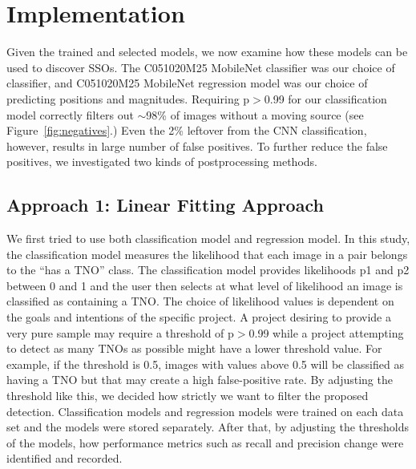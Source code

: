 \documentclass{aastex631}
\begin{document}

\section{Implementation}
\label{sect: Implementation}
Given the trained and selected models, we now examine how these models can be used to discover SSOs.
The C051020M25 MobileNet classifier was our choice of classifier, and C051020M25 MobileNet regression model was our choice of predicting positions and magnitudes.
Requiring p$>$0.99 for our classification model correctly filters out $\sim$98\% of images without a moving source (see Figure~\ref{fig:negatives}.)
Even the 2\% leftover from the CNN classification, however, results in large number of false positives.
To further reduce the false positives, we investigated two kinds of postprocessing methods.


\subsection{Approach 1: Linear Fitting Approach}
\label{Subsect: Linear Fitting Approach}
We first tried to use both classification model and regression model.
In this study, the classification model measures the likelihood that each image in a pair belongs to the ``has a TNO'' class.
The classification model provides likelihoods p1 and p2 between 0 and 1 and the user then selects at what level of likelihood an image is classified as containing a TNO. 
The choice of likelihood values is dependent on the goals and intentions of the specific project.
A project desiring to provide a very pure sample may require a threshold of p$>$0.99 while a project attempting to detect as many TNOs as possible might have a lower threshold value.
For example, if the threshold is 0.5, images with values above 0.5 will be classified as having a TNO but that may create a high false-positive rate. 
By adjusting the threshold like this, we decided how strictly we want to filter the proposed detection.
Classification models and regression models were trained on each data set and the models were stored separately.
After that, by adjusting the thresholds of the models, how performance metrics such as recall and precision change were identified and recorded.
\end{document}
